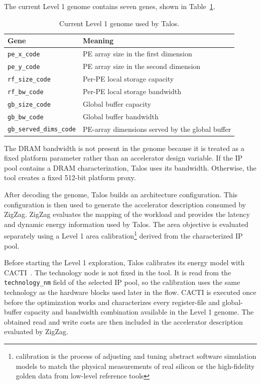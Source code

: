 The current Level 1 genome contains seven genes, shown in
Table~\ref{tab:level1_genome}.
\begin{table}[h]
\centering
\begin{tabular}{ll}
\hline
Gene & Meaning \\
\hline
\texttt{pe\_x\_code} & PE array size in the first dimension \\
\texttt{pe\_y\_code} & PE array size in the second dimension \\
\texttt{rf\_size\_code} & Per-PE local storage capacity \\
\texttt{rf\_bw\_code} & Per-PE local storage bandwidth \\
\texttt{gb\_size\_code} & Global buffer capacity \\
\texttt{gb\_bw\_code} & Global buffer bandwidth \\
\texttt{gb\_served\_dims\_code} & PE-array dimensions served by the global buffer \\
\hline
\end{tabular}
\caption{Current Level 1 genome used by Talos.}
\label{tab:level1_genome}
\end{table}

The DRAM bandwidth is not present in the genome because it is treated
as a fixed platform parameter rather than an accelerator design
variable. If the IP pool contains a DRAM characterization, Talos uses
its bandwidth. Otherwise, the tool creates a fixed 512-bit platform
proxy.

After decoding the genome, Talos builds an architecture
configuration. This configuration is then used to generate the
accelerator description consumed by ZigZag. ZigZag evaluates the
mapping of the workload and provides the latency and dynamic energy
information used by Talos. The area objective is evaluated separately
using a Level 1 area calibration\footnote{calibration is the process of adjusting and tuning abstract software simulation models to match the physical measurements of real silicon or the high-fidelity golden data from low-level reference tools} derived from the characterized IP
pool.

Before starting the Level 1 exploration, Talos calibrates its energy
model with CACTI~\cite{cacti7}. The technology node is not fixed in the tool. It is
read from the \texttt{technology\_nm} field of the selected IP pool,
so the calibration uses the same technology as the hardware blocks
used later in the flow. CACTI is executed once before the optimization
works and characterizes every register-file and global-buffer
capacity and bandwidth combination available in the Level 1 genome.
The obtained read and write costs are then included in the accelerator
description evaluated by ZigZag.

